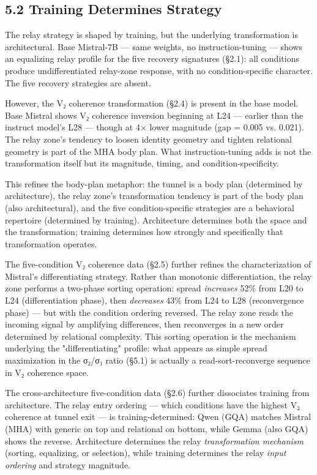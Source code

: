 \documentclass[12pt]{article}
\begin{document}
\subsection*{5.2 Training Determines Strategy}

The relay strategy is shaped by training, but the underlying transformation is architectural. Base Mistral-7B — same weights, no instruction-tuning — shows an equalizing relay profile for the five recovery signatures (§2.1): all conditions produce undifferentiated relay-zone response, with no condition-specific character. The five recovery strategies are absent.

However, the V₂ coherence transformation (§2.4) is present in the base model. Base Mistral shows V₂ coherence inversion beginning at L24 — earlier than the instruct model's L28 — though at 4× lower magnitude (gap = 0.005 vs. 0.021). The relay zone's tendency to loosen identity geometry and tighten relational geometry is part of the MHA body plan. What instruction-tuning adds is not the transformation itself but its magnitude, timing, and condition-specificity.

This refines the body-plan metaphor: the tunnel is a body plan (determined by architecture), the relay zone's transformation tendency is part of the body plan (also architectural), and the five condition-specific strategies are a behavioral repertoire (determined by training). Architecture determines both the space and the transformation; training determines how strongly and specifically that transformation operates.

The five-condition V₂ coherence data (§2.5) further refines the characterization of Mistral's differentiating strategy. Rather than monotonic differentiation, the relay zone performs a two-phase sorting operation: spread \textit{increases} 52\% from L20 to L24 (differentiation phase), then \textit{decreases} 43\% from L24 to L28 (reconvergence phase) — but with the condition ordering reversed. The relay zone reads the incoming signal by amplifying differences, then reconverges in a new order determined by relational complexity. This sorting operation is the mechanism underlying the "differentiating" profile: what appears as simple spread maximization in the σ₂/σ₁ ratio (§5.1) is actually a read-sort-reconverge sequence in V₂ coherence space.

The cross-architecture five-condition data (§2.6) further dissociates training from architecture. The relay entry ordering — which conditions have the highest V₂ coherence at tunnel exit — is training-determined: Qwen (GQA) matches Mistral (MHA) with generic on top and relational on bottom, while Gemma (also GQA) shows the reverse. Architecture determines the relay \textit{transformation mechanism} (sorting, equalizing, or selection), while training determines the relay \textit{input ordering} and strategy magnitude.
\end{document}
